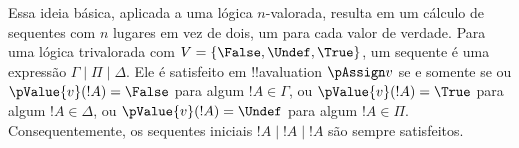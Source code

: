 \documentclass[../../../include/open-logic-section]{subfiles}
\begin{document}
Essa ideia básica, aplicada a uma lógica $n$-valorada, resulta em um
cálculo de sequentes com $n$ lugares em vez de dois, um para cada valor
de verdade. Para uma lógica trivalorada com
$V = \{\False, \Undef, \True\}$, um sequente é uma expressão
$\Gamma \mid \Pi \mid \Delta$. Ele é satisfeito em !!a{valuation}
$\pAssign v$ se e somente se ou $\pValue{v}(!A) = \False$ para algum
$!A \in \Gamma$, ou $\pValue{v}(!A) = \True$ para algum
$!A \in \Delta$, ou $\pValue{v}(!A) = \Undef$ para algum
$!A \in \Pi$. Consequentemente, os sequentes iniciais
$!A \mid !A \mid !A$ são sempre satisfeitos.
\end{document}
